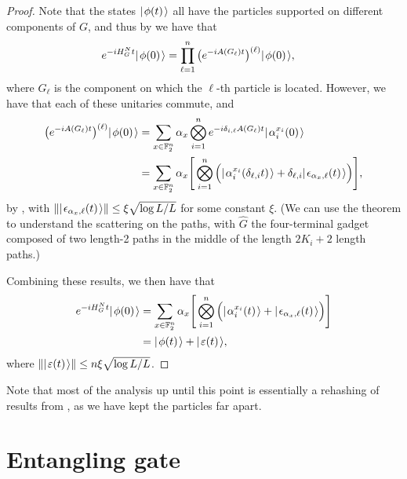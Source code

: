 \documentclass[../thesis-main/thesis-main]{subfiles}
\begin{document}
\begin{proof}
  Note that the states $|\mspace{2mu} \phi(t) \mspace{2mu} \rangle$ all have the particles supported on different components of $G$, and thus by  we have that
  \begin{align}
    e^{-i H_G^N t} |\mspace{2mu} \phi(0) \mspace{2mu} \rangle &= \prod_{\ell=1}^n \big( e^{-i A(G_\ell)t}\big)^{(\ell)} |\mspace{2mu} \phi(0) \mspace{2mu} \rangle,
  \end{align}
where $G_\ell$ is the component on which the $\ell$-th particle is located.  However, we have that each of these unitaries commute, and
  \begin{align}
    \big( e^{-i A(G_\ell)t}\big)^{(\ell)} |\mspace{2mu} \phi(0) \mspace{2mu} \rangle&= \sum_{x\in \mathbb{F}_2^n} \alpha_x \bigotimes_{i=1}^n e^{- i \delta_{i,\ell} A(G_\ell) t} |\mspace{2mu} \alpha_i^{x_i}(0) \mspace{2mu} \rangle\\
    & = \sum_{x\in \mathbb{F}_2^n} \alpha_x \Bigg[\bigotimes_{i=1}^n \Big(|\mspace{2mu} \alpha_i^{x_i}(\delta_{\ell,i} t) \mspace{2mu} \rangle + \delta_{\ell,i} |\mspace{2mu} \epsilon_{\alpha_x,\ell}(t) \mspace{2mu} \rangle\Big)\Bigg],
  \end{align}
  by , with $\Vert |\mspace{2mu} \epsilon_{\alpha_x,\ell}(t) \mspace{2mu} \rangle\Vert \leq \xi \sqrt{\log L/L}$ for some constant $\xi$.  (We can use the theorem to understand the scattering on the paths, with $\widehat{G}$ the four-terminal gadget composed of two length-2 paths in the middle of the length $2K_i + 2$ length paths.)
  
  Combining these results, we then have that
  \begin{align}
    e^{-i H_G^N t} |\mspace{2mu} \phi(0) \mspace{2mu} \rangle &= \sum_{x\in \mathbb{F}_2^n} \alpha_x \Bigg[\bigotimes_{i=1}^n \Big(|\mspace{2mu} \alpha_i^{x_i}(t) \mspace{2mu} \rangle + |\mspace{2mu} \epsilon_{\alpha_x,\ell}(t) \mspace{2mu} \rangle\Big)\Bigg]\\
      &= |\mspace{2mu} \phi(t) \mspace{2mu} \rangle + |\mspace{2mu} \varepsilon(t) \mspace{2mu} \rangle,
  \end{align}
  where $\Vert |\mspace{2mu} \varepsilon(t) \mspace{2mu} \rangle\Vert \leq n \xi \sqrt{\log L/L}$.

\end{proof}

Note that most of the analysis up until this point is essentially a rehashing of results from , as we have kept the particles far apart. 




%

\section{Entangling gate}\label{sec:entangling_gate}
\end{document}
